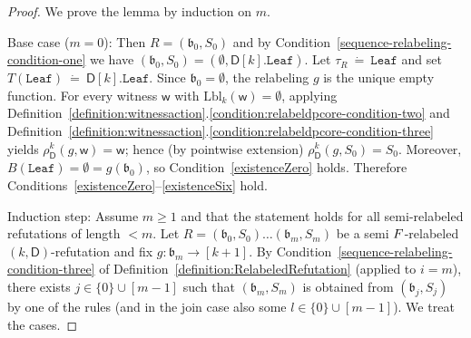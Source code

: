 \documentclass[10pt,a4paper]{amsart}
\newcommand{\abag}{\mathfrak{b}}
\newcommand{\abstractdecomposition}{\tau}
\newcommand{\action}{\rho}
\newcommand{\awitness}{\mathsf{w}}
\newcommand{\defeq}{~\dot{=}~}
\newcommand{\dpcore}{\mathsf{D}}
\newcommand{\dprefutation}{R}
\newcommand{\initialsetgeneric}{\mathtt{Leaf}}
\newcommand{\leaftype}{\mathtt{Leaf}}
\newcommand{\relabelsequence}{\textsc{F}}
\newcommand{\subtermToBag}{T}
\newcommand{\topbag}[1]{\topbagname(#1)}
\newcommand{\topbagname}{B}
\newcommand{\treewidthvalue}{k}
\newcommand{\witnessset}{S}
\begin{document}
	\begin{proof}
	We prove the lemma by induction on $m$.

Base case ($m=0$): Then $\dprefutation=(\abag_0,\witnessset_0)$ and by Condition~\ref{sequence-relabeling-condition-one} we have $(\abag_0,\witnessset_0)=(\emptyset,\dpcore[\treewidthvalue].\initialsetgeneric)$.
Let $\abstractdecomposition_{\dprefutation}\defeq \leaftype$ and set $\subtermToBag(\leaftype)\defeq \dpcore[\treewidthvalue].\initialsetgeneric$.
Since $\abag_0=\emptyset$, the relabeling $g$ is the unique empty function. For every witness $\awitness$ with $\mathrm{Lbl}_{\treewidthvalue}(\awitness)=\emptyset$, applying Definition~\ref{definition:witnessaction}.\ref{condition:relabeldpcore-condition-two} and Definition~\ref{definition:witnessaction}.\ref{condition:relabeldpcore-condition-three} yields $\action_{\dpcore}^{\treewidthvalue}(g,\awitness)=\awitness$; hence (by pointwise extension) $\action_{\dpcore}^{\treewidthvalue}(g,\witnessset_0)=\witnessset_0$.
Moreover, $\topbag{\leaftype}=\emptyset=g(\abag_0)$, so Condition~\ref{existenceZero} holds. Therefore Conditions~\ref{existenceZero}--\ref{existenceSix} hold.

Induction step: Assume $m\ge 1$ and that the statement holds for all semi-relabeled refutations of length $<m$.
Let $\dprefutation=(\abag_0,\witnessset_0)\dots(\abag_m,\witnessset_m)$ be a semi $\relabelsequence$-relabeled $(\treewidthvalue,\dpcore)$-refutation and fix $g:\abag_m\to [\treewidthvalue+1]$.
By Condition~\ref{sequence-relabeling-condition-three} of Definition~\ref{definition:RelabeledRefutation} (applied to $i=m$), there exists $j\in \{0\}\cup[m-1]$ such that $(\abag_m,\witnessset_m)$ is obtained from $(\abag_j,\witnessset_j)$ by one of the rules (and in the join case also some $l\in \{0\}\cup[m-1]$). We treat the cases.


\end{proof}
\end{document}
